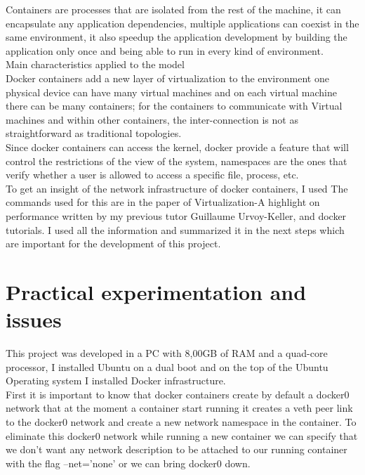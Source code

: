 Containers are processes that are isolated from the rest of the machine, it can encapsulate any application dependencies, multiple applications can coexist in the same environment, it also speedup the application development by building the application only once and being able to run in every kind of environment.\\

Main characteristics applied to the model\\

Docker containers add a new layer of virtualization to the environment one physical device can have many virtual machines and on each virtual machine there can be many containers; for the containers to communicate with Virtual machines and within other containers, the inter-connection is not as straightforward as traditional topologies.\\

Since docker containers can access the kernel, docker provide a feature that will control the restrictions of the view of the system, namespaces are the ones that verify whether a user is allowed to access a specific file, process, etc.\\

To get an insight of the network infrastructure of docker containers, I used The commands used for this are in the paper of Virtualization-A highlight on performance \cite{3} written by my previous tutor Guillaume Urvoy-Keller, and docker tutorials\cite{4}. I used all the information and summarized it in the next steps which are important for the development of this project.\\

\section{Practical experimentation and issues}

This project was developed in a PC with 8,00GB of RAM and a quad-core processor, I installed Ubuntu on a dual boot and on the top of the Ubuntu Operating system I installed Docker infrastructure.\\

First it is important to know that docker containers create by default a docker0 network that at the moment a container start running it creates a veth peer link to the docker0 network and create a new network namespace in the container. To  eliminate this docker0 network while running a new container we can specify that we don’t want any network description to be attached to our running container with the flag –net=’none’   or we can  bring docker0 down.\\

